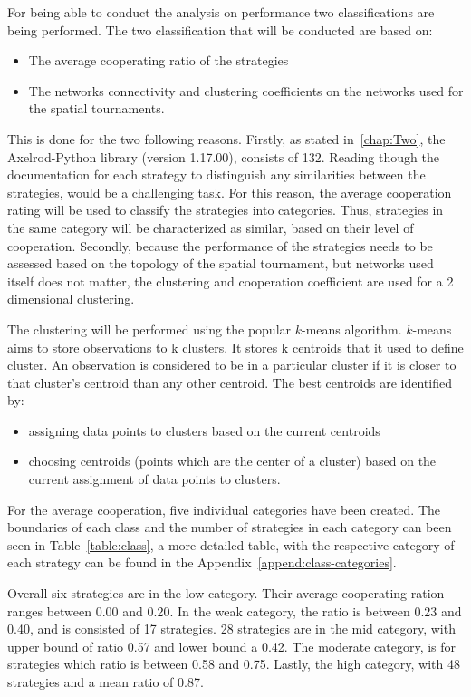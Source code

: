 For being able to conduct the analysis on performance two classifications are
being performed. The two classification that will be conducted
are based on:
\begin{itemize}
	\item The average cooperating ratio of the strategies
	\item The networks connectivity and clustering coefficients on the networks
	 			used for the spatial tournaments.
\end{itemize}

This is done for the two following reasons. Firstly, as stated in~\autoref{chap:Two},
the Axelrod-Python library (version 1.17.00), consists of 132. Reading though
the documentation for each strategy to distinguish any similarities between
the strategies, would be a challenging task. For this reason, the average cooperation
rating will be used to classify the strategies into categories. Thus, strategies
in the same category will be characterized as similar, based on their level of
cooperation. Secondly, because the performance of the strategies needs to be assessed
based on the topology of the spatial tournament, but networks used itself does
not matter, the clustering and cooperation coefficient are used for a 2 dimensional
clustering.

The clustering will be performed using the popular \(k\)-means algorithm.
\(k\)-means aims to store observations to k clusters. It stores k centroids
that it used to define cluster. An observation is considered to be in a
particular cluster if it is closer to that cluster's centroid than any other
centroid. The best centroids are identified by:
\begin{itemize}
  \item assigning data points to clusters based on the current centroids
  \item choosing centroids (points which are the center of a cluster) based on
        the current assignment of data points to clusters.
\end{itemize}

For the average cooperation, five individual categories have been created.
The boundaries of each class and the number of strategies in each category
can been seen in Table~\ref{table:class}, a more detailed table, with the respective category of each
strategy can be found in the Appendix~\ref{append:class-categories}.

Overall six strategies are in the low category. Their average cooperating ration
ranges between 0.00 and 0.20. In the weak category, the ratio is between
0.23 and 0.40, and is consisted of 17 strategies. 28 strategies are
in the mid category, with upper bound of ratio 0.57 and lower bound a 0.42.
The moderate category, is for strategies which ratio is between 0.58 and 0.75.
Lastly, the high category, with 48 strategies and a mean ratio of 0.87.

